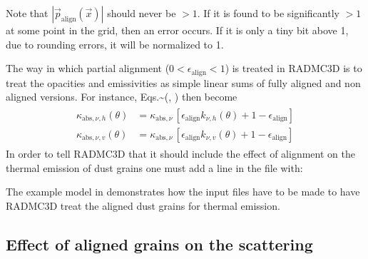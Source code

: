 \documentclass[letterpaper,10pt,english]{sphinxmanual}
\begin{document}
Note that \(|\vec p_{\mathrm{align}}(\vec x)|\) should never be
\(>1\). If it is found to be significantly \(>1\) at some point in the
grid, then an error occurs. If it is only a tiny bit above 1, due to rounding
errors, it will be normalized to 1.

The way in which partial alignment (\(0<\epsilon_{\mathrm{align}}<1\)) is
treated in RADMC\sphinxhyphen{}3D is to treat the opacities and emissivities as simple
linear sums of fully aligned and non aligned versions. For instance,
Eqs.\textasciitilde{}(, ) then become
\begin{equation*}
\begin{split}\begin{split}
\kappa_{\mathrm{abs},\nu,h}(\theta) &= \kappa_{\mathrm{abs},\nu}\,[\epsilon_{\mathrm{align}}k_{\nu,h}(\theta)+1-\epsilon_{\mathrm{align}}] \\
\kappa_{\mathrm{abs},\nu,v}(\theta) &= \kappa_{\mathrm{abs},\nu}\,[\epsilon_{\mathrm{align}}k_{\nu,v}(\theta)+1-\epsilon_{\mathrm{align}}]
\end{split}\end{split}
\end{equation*}
In order to tell RADMC\sphinxhyphen{}3D that it should include the effect of alignment on the
thermal emission of dust grains one must add a line in the  file
with:

\begin{sphinxVerbatim}[commandchars=\\\{\}]
  
\end{sphinxVerbatim}

The example model in  demonstrates how the input
files have to be made to have RADMC\sphinxhyphen{}3D treat the aligned dust grains for thermal
emission.


\subsection{Effect of aligned grains on the scattering}
\label{\detokenize{dustradtrans:effect-of-aligned-grains-on-the-scattering}}\label{\detokenize{dustradtrans:sec-align-scat}}
\end{document}
